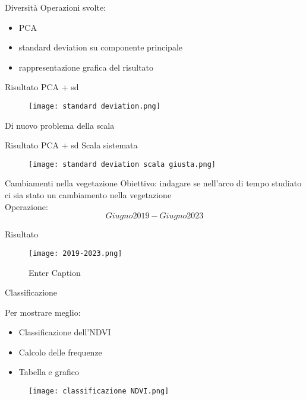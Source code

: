 \documentclass{beamer} %
\begin{document}
\begin{frame}{Diversità}
Operazioni svolte: 
	\begin{itemize}
		\item PCA
		\item standard deviation su componente principale 
		\item rappresentazione grafica del risultato
	\end{itemize}
\end{frame}


\begin{frame}{Risultato PCA + sd}
	\begin{figure}
		\centering
		\texttt{[image: standard deviation.png]}
		\label{fig:enter-label}
	\end{figure}
\centering 
Di nuovo problema della scala 
\end{frame}


\begin{frame}{Risultato PCA + sd}
Scala sistemata
	\begin{figure}
		\centering
		\texttt{[image: standard deviation scala giusta.png]}
  		\label{fig:enter-label}
	\end{figure}
\end{frame}


\begin{frame}{Cambiamenti nella vegetazione}
Obiettivo: indagare se nell'arco di tempo studiato ci sia stato un cambiamento nella vegetazione \\
Operazione: 
	\begin{equation}
		Giugno 2019 - Giugno 2023
  	\end{equation}
\end{frame}


\begin{frame}{Risultato}
	\begin{figure}
		\centering
		\texttt{[image: 2019-2023.png]}
		\caption{Enter Caption}
  		\label{fig:enter-label}
	\end{figure} 
\end{frame}


\begin{frame}{Classificazione}
\begin{multicols}{2}
Per mostrare meglio: 
	\begin{itemize}
		\item Classificazione dell'NDVI
		\item Calcolo delle frequenze
		\item Tabella e grafico 
  	\end{itemize}
\columnbreak
	\begin{figure}
		\centering
		\texttt{[image: classificazione NDVI.png]}
  		\label{fig:enter-label}
	\end{figure}
\end{multicols}
\end{frame}
\end{document}
